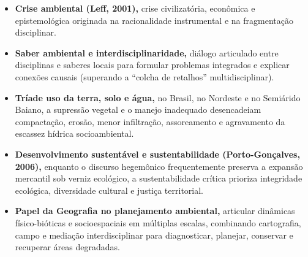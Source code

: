 \begin{boxResumo}
\begin{itemize}[leftmargin=1.5em, itemsep=3pt]
  \item \textbf{Crise ambiental (Leff, 2001),} crise civilizatória, econômica e epistemológica originada na racionalidade instrumental e na fragmentação disciplinar.
  \item \textbf{Saber ambiental e interdisciplinaridade,} diálogo articulado entre disciplinas e saberes locais para formular problemas integrados e explicar conexões causais (superando a ``colcha de retalhos'' multidisciplinar).
  \item \textbf{Tríade uso da terra, solo e água,} no Brasil, no Nordeste e no Semiárido Baiano, a supressão vegetal e o manejo inadequado desencadeiam compactação, erosão, menor infiltração, assoreamento e agravamento da escassez hídrica socioambiental.
  \item \textbf{Desenvolvimento sustentável e sustentabilidade (Porto-Gonçalves, 2006),} enquanto o discurso hegemônico frequentemente preserva a expansão mercantil sob verniz ecológico, a sustentabilidade crítica prioriza integridade ecológica, diversidade cultural e justiça territorial.
  \item \textbf{Papel da Geografia no planejamento ambiental,} articular dinâmicas físico-bióticas e socioespaciais em múltiplas escalas, combinando cartografia, campo e mediação interdisciplinar para diagnosticar, planejar, conservar e recuperar áreas degradadas.
\end{itemize}
\end{boxResumo}

